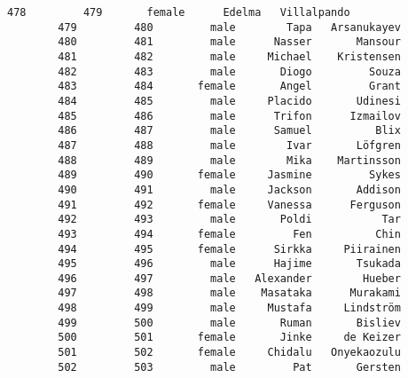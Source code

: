 \documentclass[11pt]{article}
\begin{document}
\begin{Verbatim}[commandchars=\\\{\}]
        478         479       female      Edelma   Villalpando   
        479         480         male        Tapa   Arsanukayev   
        480         481         male      Nasser       Mansour   
        481         482         male     Michael    Kristensen   
        482         483         male       Diogo         Souza   
        483         484       female       Angel         Grant   
        484         485         male     Placido       Udinesi   
        485         486         male      Trifon      Izmailov   
        486         487         male      Samuel          Blix   
        487         488         male        Ivar       Löfgren   
        488         489         male        Mika    Martinsson   
        489         490       female     Jasmine         Sykes   
        490         491         male     Jackson       Addison   
        491         492       female     Vanessa      Ferguson   
        492         493         male       Poldi           Tar   
        493         494       female         Fen          Chin   
        494         495       female      Sirkka     Piirainen   
        495         496         male      Hajime       Tsukada   
        496         497         male   Alexander        Hueber   
        497         498         male    Masataka      Murakami   
        498         499         male     Mustafa     Lindström   
        499         500         male       Ruman       Bisliev   
        500         501       female       Jinke     de Keizer   
        501         502       female     Chidalu   Onyekaozulu   
        502         503         male         Pat       Gersten   
        

\end{Verbatim}
\end{document}
